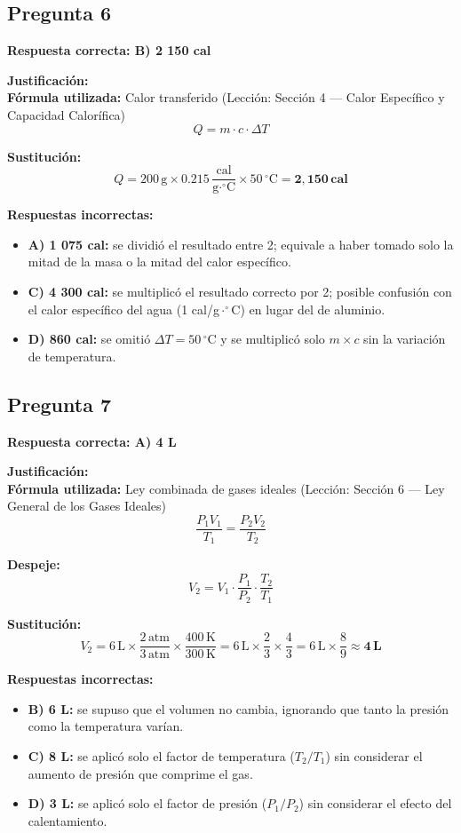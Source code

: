 \begin{respuestabox}
\subsection{Pregunta 6}
\textcolor{verdecorrecto}{\textbf{Respuesta correcta: B) 2 150 cal}}

\textbf{Justificación:}\\
\textbf{Fórmula utilizada:} Calor transferido (Lección: Sección 4 --- Calor Específico y Capacidad Calorífica)
$$Q = m \cdot c \cdot \Delta T$$

\textbf{Sustitución:}
$$Q = 200\,\text{g} \times 0.215\,\frac{\text{cal}}{\text{g}\cdot^\circ\text{C}} \times 50\,^\circ\text{C} = \mathbf{2{,}150\,\text{cal}}$$

\textbf{Respuestas incorrectas:}
\begin{itemize}
    \item \textbf{A) 1 075 cal:} se dividió el resultado entre 2; equivale a haber tomado solo la mitad de la masa o la mitad del calor específico.
    \item \textbf{C) 4 300 cal:} se multiplicó el resultado correcto por 2; posible confusión con el calor específico del agua (1 cal/g$\cdot^\circ$C) en lugar del de aluminio.
    \item \textbf{D) 860 cal:} se omitió $\Delta T = 50\,^\circ$C y se multiplicó solo $m \times c$ sin la variación de temperatura.
\end{itemize}
\end{respuestabox}

\begin{respuestabox}
\subsection{Pregunta 7}
\textcolor{verdecorrecto}{\textbf{Respuesta correcta: A) 4 L}}

\textbf{Justificación:}\\
\textbf{Fórmula utilizada:} Ley combinada de gases ideales (Lección: Sección 6 --- Ley General de los Gases Ideales)
$$\frac{P_1 V_1}{T_1} = \frac{P_2 V_2}{T_2}$$

\textbf{Despeje:}
$$V_2 = V_1 \cdot \frac{P_1}{P_2} \cdot \frac{T_2}{T_1}$$

\textbf{Sustitución:}
$$V_2 = 6\,\text{L} \times \frac{2\,\text{atm}}{3\,\text{atm}} \times \frac{400\,\text{K}}{300\,\text{K}} = 6\,\text{L} \times \frac{2}{3} \times \frac{4}{3} = 6\,\text{L} \times \frac{8}{9} \approx \mathbf{4\,\text{L}}$$

\textbf{Respuestas incorrectas:}
\begin{itemize}
    \item \textbf{B) 6 L:} se supuso que el volumen no cambia, ignorando que tanto la presión como la temperatura varían.
    \item \textbf{C) 8 L:} se aplicó solo el factor de temperatura ($T_2/T_1$) sin considerar el aumento de presión que comprime el gas.
    \item \textbf{D) 3 L:} se aplicó solo el factor de presión ($P_1/P_2$) sin considerar el efecto del calentamiento.
\end{itemize}
\end{respuestabox}

